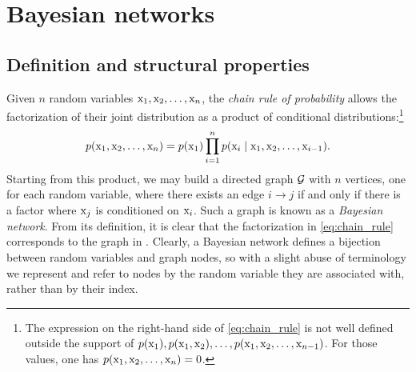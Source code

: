 \section{Bayesian networks}
\label{sec:bayesian_networks}

\subsection{Definition and structural properties}
\label{sec:bayesian_net_definition}

Given $n$ random variables ${\textnormal{x}}_1, {\textnormal{x}}_2, \dots, {\textnormal{x}}_n$, the \emph{chain rule of probability} allows the factorization of their joint distribution as a product of conditional distributions:\footnote{The expression on the right-hand side of \eqref{eq:chain_rule} is not well defined outside the support of $p({\textnormal{x}}_1), p({\textnormal{x}}_1, {\textnormal{x}}_2), \dots, p({\textnormal{x}}_1, {\textnormal{x}}_2, \dots, {\textnormal{x}}_{n-1})$. For those values, one has $p({\textnormal{x}}_1, {\textnormal{x}}_2, \dots, {\textnormal{x}}_n)=0$.}
\begin{equation}
    \label{eq:chain_rule}
    p({\textnormal{x}}_1,{\textnormal{x}}_2,\dots,{\textnormal{x}}_n) = p({\textnormal{x}}_1) \prod_{i=1}^n p({\textnormal{x}}_i \mid {\textnormal{x}}_{1}, {\textnormal{x}}_{2}, \dots, {\textnormal{x}}_{i-1}).
\end{equation}
Starting from this product, we may build a directed graph ${\mathcal{G}}$ with $n$ vertices, one for each random variable, where there exists an edge $i \rightarrow j$ if and only if there is a factor where ${\textnormal{x}}_j$ is conditioned on ${\textnormal{x}}_i$. Such a graph is known as a \emph{Bayesian network}. From its definition, it is clear that the factorization in \eqref{eq:chain_rule} corresponds to the graph in . Clearly, a Bayesian network defines a bijection between random variables and graph nodes, so with a slight abuse of terminology we represent and refer to nodes by the random variable they are associated with, rather than by their index.

